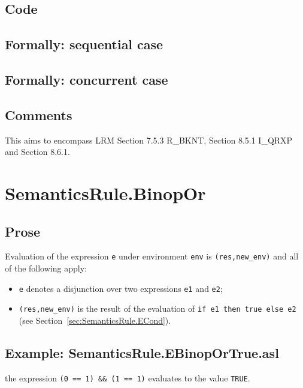 \documentclass{book}
\begin{document}
  \subsection{Code}

\begin{emptyformal}
  \subsection{Formally: sequential case}

  \subsection{Formally: concurrent case}
\end{emptyformal}

  \subsection{Comments}
  This aims to encompass LRM Section 7.5.3 R\_BKNT, Section 8.5.1 I\_QRXP and Section
  8.6.1.

\section{SemanticsRule.BinopOr \label{sec:SemanticsRule.BinopOr}}
  \subsection{Prose}
  Evaluation of the expression \texttt{e} under environment \texttt{env} is
  \texttt{(res,new\_env)} and all of the following apply:
  \begin{itemize}
  \item \texttt{e} denotes a disjunction over two expressions \texttt{e1} and \texttt{e2};
  \item \texttt{(res,new\_env)} is the result of the evaluation of \texttt{if 
e1 then true else e2} (see Section~\ref{sec:SemanticsRule.ECond}).
  \end{itemize}

  \subsection{Example: SemanticsRule.EBinopOrTrue.asl}
    the expression \texttt{(0 == 1) \textbar\textbar \&\& (1 == 1)} evaluates to the value \texttt{TRUE}.
\end{document}
